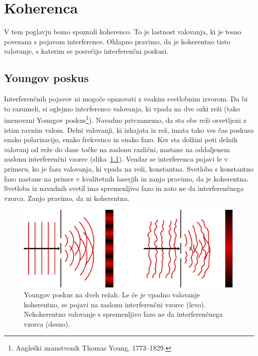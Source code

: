 
\chapter{Koherenca}

V tem poglavju bomo spoznali koherenco. To je lastnost
valovanja, ki je tesno povezana s pojavom interference. Ohlapno pravimo,
da je koherentno tisto valovanje, s katerim se posrečijo interferenčni
poskusi.  

\section{Youngov poskus}

Interferenčnih pojavov ni mogoče opazovati z
vsakim svetlobnim izvorom. Da bi to razumeli, si oglejmo interferenco
valovanja, ki vpada na dve ozki reži (tako imenovani Youngov 
poskus\footnote{Angleški znanstvenik Thomas Young, 1773--1829.}). 
Navadno privzamemo, da
sta obe reži osvetljeni z istim ravnim valom. Delni valovanji, ki
izhajata iz rež, imata tako ves čas poskusa enako polarizacijo, enako
frekvenco in enako fazo. Ker sta dolžini poti delnih valovanj od reže do dane 
točke na zaslonu različni, nastane na oddaljenem
zaslonu interferenčni vzorec (slika~\ref{fig:Young}). Vendar se  
interferenca pojavi le v primeru,
ko je faza valovanja, ki vpada na reži, konstantna. Svetloba s konstantno
fazo nastane na primer v kvalitetnih laserjih in zanjo pravimo, da je koherentna.
Svetloba iz navadnih svetil ima spremenljivo fazo in zato ne da
interferenčnega vzorca. Zanjo pravimo, da ni koherentna. 
\begin{figure}[h]
\centering
\includegraphics[width=10truecm]{slike/02_Young.pdf}
\caption{Youngov poskus na dveh režah. Le če je vpadno valovanje koherentno, 
se pojavi na zaslonu interferenčni vzorec (levo). Nekoherentno valovanje s spremenljivo
fazo ne da interferenčnega vzorca (desno).}
\label{fig:Young}
\end{figure}

